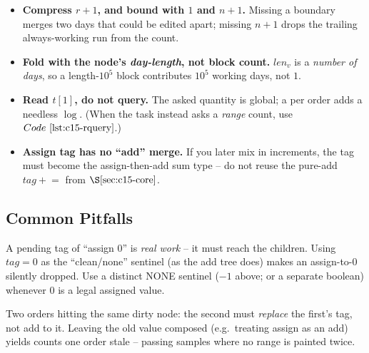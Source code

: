 \begin{hardeningbox}
\begin{itemize}[nosep,leftmargin=1.4em]
  \item \textbf{Compress \(r+1\), and bound with \(1\) and \(n+1\).}  Missing a boundary merges two days that could be edited apart; missing \(n+1\) drops the trailing always-working run from the count.
  \item \textbf{Fold with the node's \emph{day-length}, not block count.}  \(\mathit{len}_v\) is a \emph{number of days}, so a length-\(10^5\) block contributes \(10^5\) working days, not \(1\).
  \item \textbf{Read \(t[1]\), do not query.}  The asked quantity is global; a  per order adds a needless \(\log\).  (When the task instead asks a \emph{range} count, use \(\coderef{c15-rquery}\).)
  \item \textbf{Assign tag has no ``add'' merge.}  If you later mix in increments, the tag must become the assign-then-add sum type -- do not reuse the pure-add \(\mathit{tag}\mathrel{+}=\) from \(\secref{c15-core}\).
\end{itemize}
\end{hardeningbox}

\subsection{Common Pitfalls}

\begin{warningbox}
A pending tag of ``assign \(0\)'' is \emph{real work} -- it must reach the children.  Using \(\mathit{tag}=0\) as the ``clean/none'' sentinel (as the add tree does) makes an assign-to-0 silently dropped.  Use a distinct NONE sentinel (\(-1\) above; or a separate boolean) whenever \(0\) is a legal assigned value.
\end{warningbox}

\begin{warningbox}
Two orders hitting the same dirty node: the second must \emph{replace} the first's tag, not add to it.  Leaving the old value composed (e.g.\ treating assign as an add) yields counts one order stale -- passing samples where no range is painted twice.
\end{warningbox}

